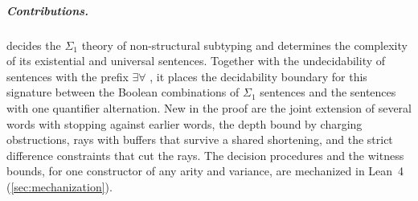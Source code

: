 

\subparagraph*{Contributions.}
 decides the $\Sigma_1$ theory of non-structural subtyping and determines
the complexity of its existential and universal sentences. Together with the undecidability
of sentences with the prefix $\exists\forall$ \cite{Zhao26S2}, it places the decidability
boundary for this signature between the Boolean combinations of $\Sigma_1$ sentences and
the sentences with one quantifier alternation.
New in the proof are the joint extension of several words with stopping against earlier
words, the depth bound by charging obstructions, rays with buffers that survive a shared
shortening, and the strict difference constraints that cut the rays. The decision procedures
and the witness bounds, for one constructor of any arity and variance, are mechanized in
Lean~4 (\cref{sec:mechanization}).
